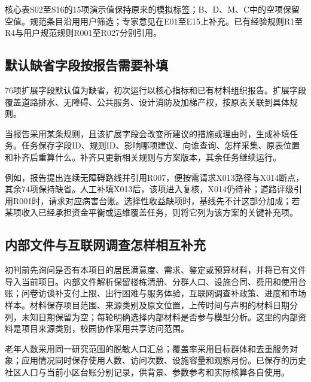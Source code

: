 \documentclass[UTF8,11pt,fontset=windows]{ctexart}
\begin{document}
核心表S02至S16的15项演示值保持原来的模拟标签；B、D、M、C中的空项保留空值。规范条目沿用用户筛选；专家意见在E01至E15上补充。已有经验规则R1至R4与用户规范规则R001至R027分别引用。



\subsection{默认缺省字段按报告需要补填}

76项扩展字段默认值为缺省，初次运行以核心指标和已有材料组织报告。扩展字段覆盖道路排水、无障碍、公共服务、设计消防及加梯产权，按原表关联到具体规则。

当报告采用某条规则，且该扩展字段会改变所建议的措施或理由时，生成补填任务。任务保存字段ID、规则ID、影响哪项建议、向谁查询、怎样采集、原表位置和补齐后重算什么。补齐只更新相关规则与方案版本，其余任务继续运行。

例如，报告提出连续无障碍路线并引用R007，便按需请求X013路径与X014断点，其余74项保持缺省。人工补填X013后，该项进入复核，X014仍待补；道路评级引用R001时，请求对应病害台账。选择性收益缺项时，基线先不计这部分加成；若某项收入已经承担资金平衡或运维覆盖任务，则将它列为该方案的关键补充项。

\subsection{内部文件与互联网调查怎样相互补充}

初判前先询问是否有本项目的居民满意度、需求、鉴定或预算材料，并将已有文件导入当前项目。内部文件解析保留楼栋清册、分群人口、设施合同、费用和使用台账；问卷访谈补支付上限、出行困难与服务体验，互联网调查补政策、进度和市场样本。材料保存项目范围、来源类别及原文位置，上传时间与声明的材料日期分列，未知日期保留为空；每轮明确选择内部材料是否参与模型分析。这里的内部资料是项目来源类别，校园协作采用共享访问范围。

老年人数采用同一研究范围的脱敏人口汇总；覆盖率采用目标群体和去重服务对象；应用情况同时保存使用人数、访问次数、设施容量和观察月份。已保存的历史社区人口与当前小区台账分别记录，供背景、参数参考和实际核算各自使用。
\end{document}
